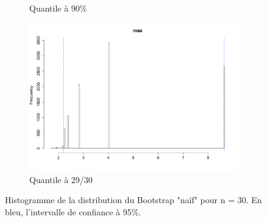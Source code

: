 \documentclass{article}
\renewcommand*{\(}{ \left( }
\renewcommand*{\)}{ \right) }
\begin{document}
\begin{figure}[H]
\begin{subfigure}[t]{0.3\textwidth}
        \caption{Quantile à 90\%}
        \label{naifB90}
    \end{subfigure}%
    \begin{subfigure}[t]{0.3\textwidth}
        \includegraphics[width = \linewidth]{img/BootstrapNaif-Max-30.pdf}
        \caption{Quantile à 29/30}
        \label{fig:naifBMax}
    \end{subfigure}%
    \caption{Histogramme de la distribution du Bootstrap "naïf" pour n = 30. En bleu, l'intervalle de confiance à 95\%.}
    \label{fig:naifB}
\end{figure}
\end{document}
